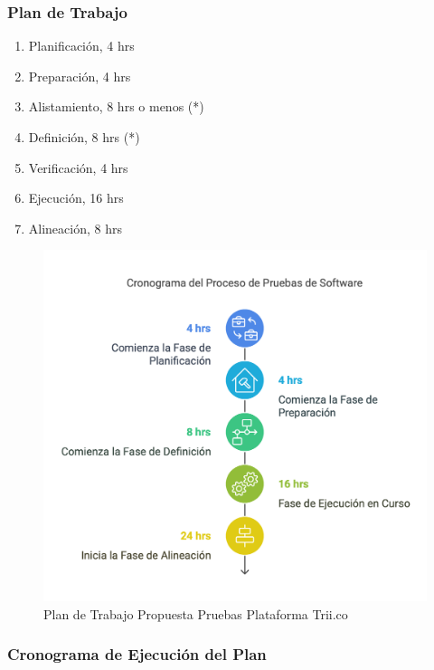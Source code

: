 \documentclass[
  paper=a4,
  ,captions=tableheading
]{scrartcl}
\providecommand{\tightlist}{%
  \setlength{\itemsep}{0pt}\setlength{\parskip}{0pt}}
\begin{document}
\subsubsection{Plan de Trabajo}\label{sec:plan-de-trabajo}

\begin{enumerate}
\def\labelenumi{\arabic{enumi}.}
\tightlist
\item
  Planificación, 4 hrs
\item
  Preparación, 4 hrs
\item
  Alistamiento, 8 hrs o menos (*)
\item
  Definición, 8 hrs (*)
\item
  Verificación, 4 hrs
\item
  Ejecución, 16 hrs
\item
  Alineación, 8 hrs
\end{enumerate}

\begin{figure}
\centering
\includegraphics{images/plan.png}
\caption{Plan de Trabajo Propuesta Pruebas Plataforma
Trii.co}\label{fig:plan}
\end{figure}

\subsubsection{Cronograma de Ejecución del
Plan}\label{sec:cronograma-de-ejecuciuxf3n-del-plan}
\end{document}
